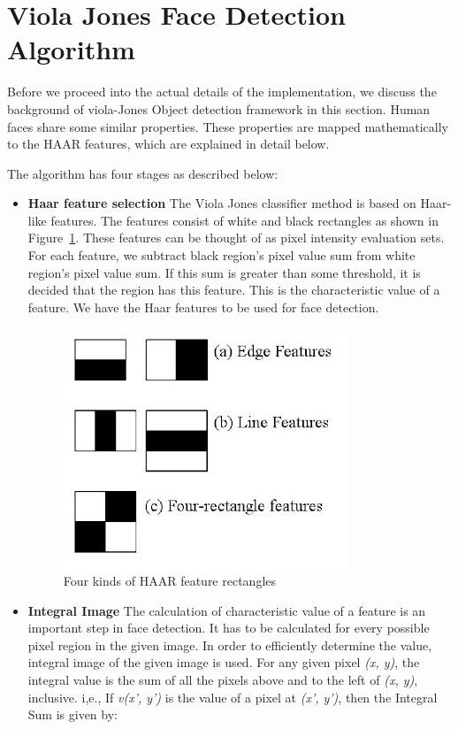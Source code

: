 \section{Viola Jones Face Detection Algorithm}\label{sec:viola}

Before we proceed into the actual details of the implementation, we discuss the background of viola-Jones Object detection 
framework in this section. Human faces share some similar properties. 
These properties are mapped mathematically to the HAAR features, which are explained in detail below.


The algorithm has four stages as described below:
\begin{itemize}
\item \textbf{Haar feature selection}
The Viola Jones classifier method is based on Haar-like features. The features consist of 
white and black rectangles as shown in Figure~\ref{fig:haar}. These features can be thought of as pixel intensity evaluation sets. 
For each feature, we subtract black region’s pixel value sum from white region’s pixel value sum. 
If this sum is greater than some threshold, it is decided that the region has this feature. 
This is the characteristic value of a feature. We have the Haar features to be used for face detection.

\begin{figure}[h]
  \centering
  \includegraphics[width=0.5\linewidth]{figs/haar.jpg}
  \caption{Four kinds of HAAR feature rectangles \textnormal{\small }  }
  \label{fig:haar}
\end{figure}

\item \textbf{Integral Image}
The calculation of characteristic value of a feature is an important step in 
face detection. It has to be calculated for every possible pixel region in the given image. 
In order to efficiently determine the value, integral image of the given image is used. 
For any given pixel \emph{(x, y)}, the integral value is the sum of all the pixels above and to 
the left of \emph{(x, y)}, inclusive.
i,e., If \emph{v(x’, y’)} is the value of a pixel at \emph{(x’, y’)},  then the
Integral Sum is given by:


\end{itemize}
